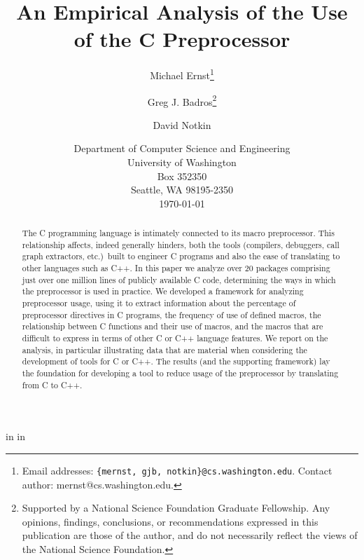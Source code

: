 
\marginparwidth 0pt
\oddsidemargin  0pt
\evensidemargin 0pt
\marginparsep 0pt

\topmargin   0pt

 in
 in




\title{An Empirical Analysis of the Use of the C Preprocessor}

\author{Michael Ernst\thanks{Email 
addresses: {\tt \{mernst, gjb, notkin\}@cs.washington.edu}.  Contact author:
mernst@cs.washington.edu.}
\and Greg J. Badros\thanks{Supported by a National Science Foundation
    Graduate Fellowship. Any opinions, findings, conclusions, or
    recommendations expressed in this publication are those of the
    author, and do not necessarily reflect the views of the National
    Science Foundation.} \and David Notkin}

\date{Department of Computer
Science and Engineering\\
University of Washington\\
Box 352350\\
Seattle, WA  98195-2350\\
\today}  

\maketitle


\begin{abstract}

  The C programming language is intimately connected to its macro
  preprocessor.  This relationship affects, indeed generally hinders,
  both the tools (compilers, debuggers, call graph extractors, etc.)\ 
  built to engineer C programs and also the ease of translating to other
  languages such as C++.  In this paper we analyze over 20 packages
  comprising just over one million lines of publicly available C code,
  determining the ways in which the preprocessor is used in practice.
  We developed a framework for analyzing preprocessor usage, using it to
  extract information about the percentage of preprocessor directives in
  C programs, the frequency of use of defined macros, the relationship
  between C functions and their use of macros, and the macros that are
  difficult to express in terms of other C or C++ language features.  We
  report on the analysis, in particular illustrating data that are
  material when considering the development of tools for C or C++.  The
  results (and the supporting framework) lay the foundation for
  developing a tool to reduce usage of the preprocessor by translating
  from C to C++.

\end{abstract}

